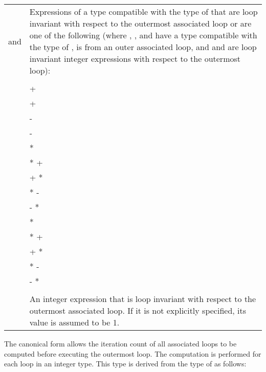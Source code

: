 \begin{fortranspecific}
\begin{supertabular}{ p{0.8in} p{4.5in}}
    {} and {} & Expressions of a type compatible with the
    type of {} that are loop invariant with respect to the outermost
    associated loop or are one of the following (where {},
    {}, and {} have a type compatible with the type of
    {}, {} is {} from an outer associated
    loop, and {} and {} are loop invariant integer
    expressions with respect to the outermost loop): \\
    & {} \\
    & {} + {} \\
    & {} + {} \\
    & {} - {} \\
    & {} - {} \\
    & {} {*} {} \\
    & {} {*} {} + {} \\
    & {} + {} {*} {} \\
    & {} {*} {} - {} \\
    & {} - {} {*} {} \\
    & {} {*} {} \\
    & {} {*} {} + {} \\
    & {} + {} {*} {} \\
    & {} {*} {} - {} \\
    & {} - {} {*} {} \\
    & \\

    {} & An integer expression that is loop invariant with respect
    to the outermost associated loop. If it is not explicitly specified, its value is
    assumed to be 1. \\
\end{supertabular}
\medskip
\end{fortranspecific}


\linenumbers

The canonical form allows the iteration count of all associated loops to be computed
before executing the outermost loop. The computation is performed for each loop in an
integer type. This type is derived from the type of  as follows:

